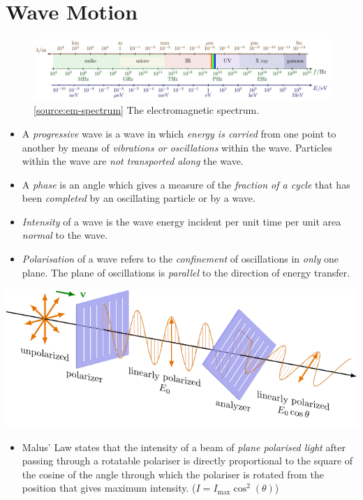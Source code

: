 \documentclass[oneside]{book}
\begin{document}
\chapter{Wave Motion}
\begin{figure}[H]
    \centering
    \includegraphics[width=\textwidth]{../images/em-spectrum/em-spectrum.pdf}
    \caption{\ref{source:em-spectrum} The electromagnetic spectrum.}
    \label{fig:em-spectrum}
\end{figure}
\begin{itemize}
    \item A \emph{progressive} wave is a wave in which \emph{energy is carried} from one point to another by means of \emph{vibrations or oscillations} within the wave. Particles within the wave are \emph{not transported along} the wave.
    \item A \emph{phase} is an angle which gives a measure of the \emph{fraction of a cycle} that has been \emph{completed} by an oscillating particle or by a wave.
    \item \emph{Intensity} of a wave is the wave energy incident per unit time per unit area \emph{normal} to the wave.
    \item \emph{Polarisation} of a wave refers to the \emph{confinement} of oscillations in \emph{only} one plane. The plane of oscillations is \emph{parallel} to the direction of energy transfer.  
\end{itemize}
\begin{minipage}{3cm+15.2363pt}
    \includegraphics[page=4]{../images/Malus'-Law/Malus'-Law.pdf}
\end{minipage}%
\begin{minipage}{\textwidth-3cm-15.2363pt}
    \begin{itemize}
        \item Malus' Law states that the intensity of a beam of \emph{plane polarised light} after passing through a rotatable polariser is directly proportional to the square of the cosine of the angle through which the polariser is rotated from the position that gives maximum intensity. (\(I=I_{\text{max}}\cos^2(\theta)\))
    \end{itemize}
\end{minipage}
\end{document}
